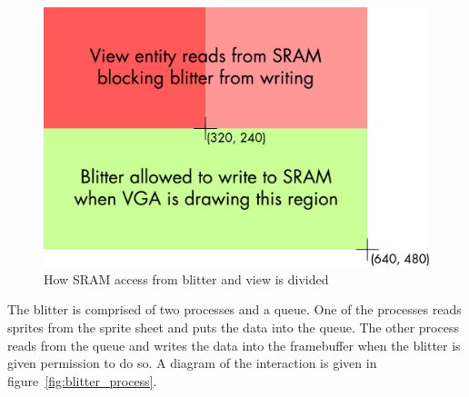 \documentclass{report}
\begin{document}
\begin{figure}[htb!]
    \begin{center}
        \includegraphics[width=4.5in]{blitter_waitrequest}
    \end{center}
    \caption{How SRAM access from blitter and view is divided}
    \label{fig:blitter_waitrequest}
\end{figure}

The blitter is comprised of two processes and a queue. One of the
processes reads sprites from the sprite sheet and puts the data into the
queue. The other process reads from the queue and writes the data into
the framebuffer when the blitter is given permission to do so. A diagram
of the interaction is given in figure~\ref{fig:blitter_process}.
\end{document}

